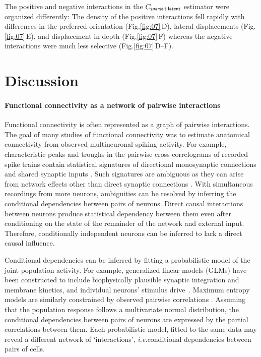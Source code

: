 \documentclass[10pt]{article}
\newcommand{\sq}[1]{\lq#1\rq}
\newcommand{\figref}[2]{Fig.\;\ref{fig:#1}\,#2}
\newcommand{\ie}{\emph{i.e.}\;}
\begin{document}
The positive and negative interactions in the $C_{\sf sparse+latent}$ estimator were organized differently: The density of the positive interactions fell rapidly with differences in the preferred orientation (\figref{07}{D}), lateral displacements (\figref{07}{E}), and displacement in depth (\figref{07}{F}) whereas the negative interactions were much less selective (\figref{07}{D--F}).

\section*{Discussion}
\paragraph{Functional connectivity as a network of pairwise interactions}
Functional connectivity is often represented as a graph of pairwise interactions. The goal of many studies of functional connectivity was to estimate  anatomical connectivity from  observed multineuronal spiking activity.  For example, characteristic peaks and troughs in the pairwise cross-correlograms of recorded spike trains contain statistical signatures of directional monosynaptic connections and shared synaptic inputs \cite{Gerstein:1964, Perkel:1967, Moore:1970, Alonso:1998, Denman:2013}.  Such signatures are ambiguous as they can arise from network effects other than direct synaptic connections \cite{Aertsen:1989}.  With simultaneous recordings from more neurons, ambiguities can be resolved by inferring the conditional dependencies between pairs of neurons.  Direct causal interactions between neurons produce statistical dependency between them even after conditioning on the state of the remainder of the network and external input. Therefore, conditionally independent neurons can be inferred to lack a direct causal influence.  

Conditional dependencies can be inferred by fitting a probabilistic model of the joint population activity. For example, generalized linear models (GLMs) have been constructed to  include biophysically plausible synaptic integration and membrane kinetics, and individual neurons' stimulus drive~\cite{Pillow:2008}.  Maximum entropy models are similarly constrained by observed pairwise correlations \cite{Schneidman:2006, Tkacik:2006, Yu:2008, Tang:2008, Shlens:2009}.  Assuming that the population response follows a multivariate normal distribution, the conditional dependencies between pairs of neurons are expressed by the partial correlations between them.   Each probabilistic model, fitted to the same data may reveal a different network of \sq{interactions},  \ie conditional dependencies between pairs of cells. 
\end{document}
